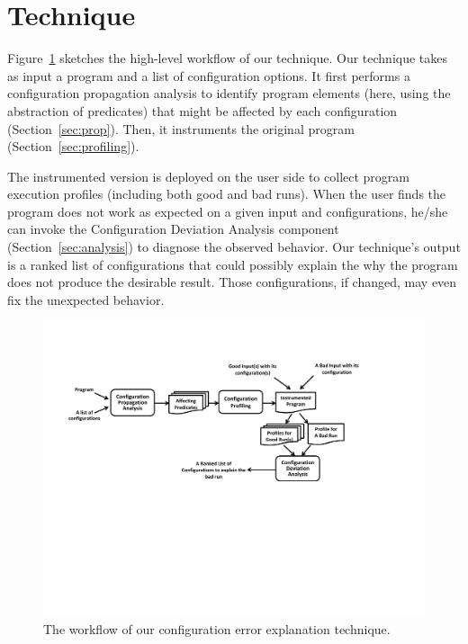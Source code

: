 \section{Technique}
\label{sec:technique}

Figure~\ref{fig:workflow} sketches the high-level workflow of our technique.
Our technique takes as input a program and a list of configuration options.
It first performs a configuration propagation analysis to identify
program elements (here, using the abstraction of predicates) that might be
affected by each configuration (Section~\ref{sec:prop}). Then, it
instruments the original program (Section~\ref{sec:profiling}).

The instrumented version is deployed on the user side to collect program execution
profiles (including both good and bad runs). When the user finds the program
does not work as expected on a given input and configurations,
he/she can invoke the Configuration Deviation Analysis component (Section~\ref{sec:analysis}) to
diagnose the observed behavior. Our technique's output is a ranked list of
configurations that could possibly explain the why the program does not produce the desirable result. Those
configurations, if changed, may even fix the unexpected behavior.

\begin{figure}[!]
  \centering
  \includegraphics[scale=0.750]{workflow}
  \vspace*{-2.0ex}\caption {{\label{fig:workflow} The workflow of our configuration error explanation technique.
}}
\end{figure}


